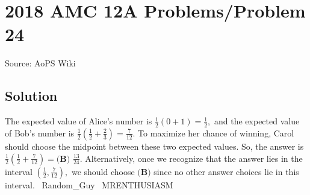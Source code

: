 \documentclass[12pt]{article}
\begin{document}
\section*{{2018 AMC 12A Problems/Problem 24}}
Source: AoPS Wiki

\subsection*{Solution}
The expected value of Alice's number is $\frac12\left(0+1\right)=\frac12,$ and the expected value of Bob's number is $\frac12\left(\frac12+\frac23\right)=\frac{7}{12}.$ To maximize her chance of winning, Carol should choose the midpoint between these two expected values. So, the answer is $\frac12\left(\frac12+\frac{7}{12}\right)=\boxed{\textbf{(B) }\frac{13}{24}}.$ Alternatively, once we recognize that the answer lies in the interval $\left(\frac12,\frac{7}{12}\right),$ we should choose $\textbf{(B)}$ since no other answer choices lie in this interval. ~Random_Guy ~MRENTHUSIASM
\end{document}
